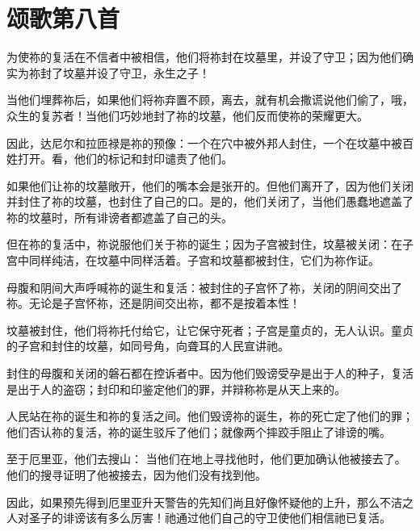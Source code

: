 
\section{颂歌第八首}

为使祢的复活在不信者中被相信，他们将祢封在坟墓里，并设了守卫；因为他们确实为祢封了坟墓并设了守卫，永生之子！\par

当他们埋葬祢后，如果他们将祢弃置不顾，离去，就有机会撒谎说他们偷了，哦，众生的复苏者！当他们巧妙地封了祢的坟墓，他们反而使祢的荣耀更大。\par

因此，达尼尔和拉匝禄是祢的预像：一个在穴中被外邦人封住，一个在坟墓中被百姓打开。看，他们的标记和封印谴责了他们。\par

如果他们让祢的坟墓敞开，他们的嘴本会是张开的。但他们离开了，因为他们关闭并封住了祢的坟墓，也封住了自己的口。是的，他们关闭了，当他们愚蠢地遮盖了祢的坟墓时，所有诽谤者都遮盖了自己的头。\par

但在祢的复活中，祢说服他们关于祢的诞生；因为子宫被封住，坟墓被关闭：在子宫中同样纯洁，在坟墓中同样活着。子宫和坟墓都被封住，它们为祢作证。\par

母腹和阴间大声呼喊祢的诞生和复活：被封住的子宫怀了祢，关闭的阴间交出了祢。无论是子宫怀祢，还是阴间交出祢，都不是按着本性！\par

坟墓被封住，他们将祢托付给它，让它保守死者；子宫是童贞的，无人认识。童贞的子宫和封住的坟墓，如同号角，向聋耳的人民宣讲祂。\par

封住的母腹和关闭的磐石都在控诉者中。因为他们毁谤受孕是出于人的种子，复活是出于人的盗窃；封印和印鉴定他们的罪，并辩称祢是从天上来的。\par

人民站在祢的诞生和祢的复活之间。他们毁谤祢的诞生，祢的死亡定了他们的罪；他们否认祢的复活，祢的诞生驳斥了他们；就像两个摔跤手阻止了诽谤的嘴。\par

至于厄里亚，他们去搜山： 当他们在地上寻找他时，他们更加确认他被接去了。他们的搜寻证明了他被接去，因为他们没有找到他。\par

因此，如果预先得到厄里亚升天警告的先知们尚且好像怀疑他的上升，那么不洁之人对圣子的诽谤该有多么厉害！祂通过他们自己的守卫使他们相信祂已复活。\par

